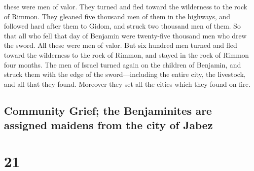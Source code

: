 these were men of valor.  They turned and fled toward the
wilderness to the rock of Rimmon. They gleaned five thousand men of them
in the highways, and followed hard after them to Gidom, and struck two
thousand men of them.  So that all who fell that day of
Benjamin were twenty-five thousand men who drew the sword. All these
were men of valor.  But six hundred men turned and fled
toward the wilderness to the rock of Rimmon, and stayed in the rock of
Rimmon four months.  The men of Israel turned again on
the children of Benjamin, and struck them with the edge of the
sword---including the entire city, the livestock, and all that they
found. Moreover they set all the cities which they found on fire.

\hypertarget{community-grief-the-benjaminites-are-assigned-maidens-from-the-city-of-jabez}{%
\subsection{Community Grief; the Benjaminites are assigned maidens from
the city of
Jabez}\label{community-grief-the-benjaminites-are-assigned-maidens-from-the-city-of-jabez}}

\hypertarget{section-20}{%
\section{21}\label{section-20}}

